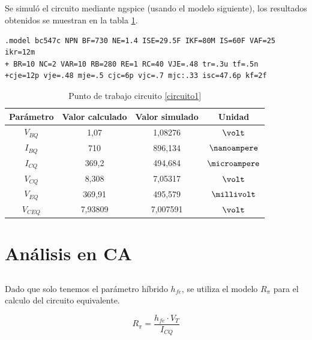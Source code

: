 \documentclass[12pt,letterpaper]{article}     %
\begin{document}
\subsection{}

Se simuló el circuito mediante ngspice (usando el modelo siguiente),
los resultados obtenidos se muestran en la tabla \ref{tab:PuntoDeTrabajoSimulado}.

\begin{lstlisting}
.model bc547c NPN BF=730 NE=1.4 ISE=29.5F IKF=80M IS=60F VAF=25 ikr=12m
+ BR=10 NC=2 VAR=10 RB=280 RE=1 RC=40 VJE=.48 tr=.3u tf=.5n
+cje=12p vje=.48 mje=.5 cjc=6p vjc=.7 mjc:.33 isc=47.6p kf=2f
\end{lstlisting}

\begin{table}[!ht]
	\begin{center}
		\begin{tabular}{| c | c | c | c |}
			\hline
			\textbf{Parámetro} & \textbf{Valor calculado} & \textbf{Valor simulado} & \textbf{Unidad}\\ 
			\hline
			{$V_{BQ}$} & {1,07} & {1,08276} & {$\volt$} \\
			\hline
			{$I_{BQ}$} & {710} & {896,134} & {$\nanoampere$} \\
			\hline
			{$I_{CQ}$} & {369,2} & {494,684} & {$\microampere$}\\
			\hline
			{$V_{CQ}$} & {8,308} & {7,05317} & {$\volt$}\\
			\hline
			{$V_{EQ}$} & {369,91} & {495,579} & {$\millivolt$}\\
			\hline
			{$V_{CEQ}$} & {7,93809} & {7,007591} & {$\volt$}\\
			\hline
		\end{tabular}
	\end{center}
	\caption{Punto de trabajo circuito \ref{circuito1}}
\label{tab:PuntoDeTrabajoSimulado}
\end{table}

\clearpage
\section{Análisis en CA}
\subsection{}

Dado que solo tenemos el parámetro híbrido $h_{fe}$, se utiliza el modelo $R_{\pi}$
para el calculo del circuito equivalente.

\begin{equation}
	R_{\pi}=
	\frac{
		h_{fe}\cdot V_T
	}{
		I_{CQ}
	}
\end{equation}
\end{document}
